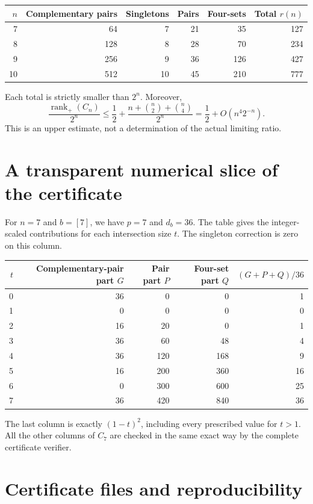 \documentclass[11pt]{article}
\DeclareMathOperator{\rank}{rank}
\newcommand{\rankp}{\rank_{+}}
\begin{document}
\begin{center}
\begin{tabular}{rrrrrr}
\toprule
$n$ & Complementary pairs & Singletons & Pairs & Four-sets & Total $r(n)$ \\
\midrule
7 & 64 & 7 & 21 & 35 & 127 \\
8 & 128 & 8 & 28 & 70 & 234 \\
9 & 256 & 9 & 36 & 126 & 427 \\
10 & 512 & 10 & 45 & 210 & 777 \\
\bottomrule
\end{tabular}
\end{center}
Each total is strictly smaller than $2^n$. Moreover,
\[
\frac{\rankp(C_n)}{2^n}\le\frac12+\frac{n+\binom n2+\binom n4}{2^n}
=\frac12+O(n^4 2^{-n}).
\]
This is an upper estimate, not a determination of the actual limiting ratio.

\section{A transparent numerical slice of the certificate}

For $n=7$ and $b=[7]$, we have $p=7$ and $d_b=36$. The table gives the integer-scaled contributions for each intersection size $t$. The singleton correction is zero on this column.

\begin{center}
\begin{tabular}{rrrrr}
\toprule
$t$ & Complementary-pair part $G$ & Pair part $P$ & Four-set part $Q$ & $(G+P+Q)/36$ \\
\midrule
0 & 36 & 0 & 0 & 1 \\
1 & 0 & 0 & 0 & 0 \\
2 & 16 & 20 & 0 & 1 \\
3 & 36 & 60 & 48 & 4 \\
4 & 36 & 120 & 168 & 9 \\
5 & 16 & 200 & 360 & 16 \\
6 & 0 & 300 & 600 & 25 \\
7 & 36 & 420 & 840 & 36 \\
\bottomrule
\end{tabular}
\end{center}
The last column is exactly $(1-t)^2$, including every prescribed value for $t>1$. All the other columns of $C_7$ are checked in the same exact way by the complete certificate verifier.

\newpage
\section{Certificate files and reproducibility}
\end{document}
